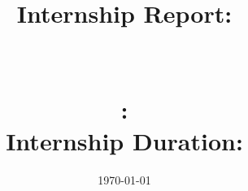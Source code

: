 \titleformat{\section}{\normalfont\Large\bfseries}{\thesection}{1em}{}
\title{
    \vspace{3cm} 
    \large Internship Report: \\
    \vspace{0.5cm} 
    \textbf{\Huge \REPORTTITLE} \\
    \vspace{1cm} 
    \large \LOCATION \\
    \vspace{0.5cm} 
    \large \SUPERVISOR: \\
    \vspace{0.5cm} 
    \large Internship Duration: \INTERNSHIPDURATION}

\author{\AUTHORNAME}
\date{\today}
\maketitle
\thispagestyle{empty}